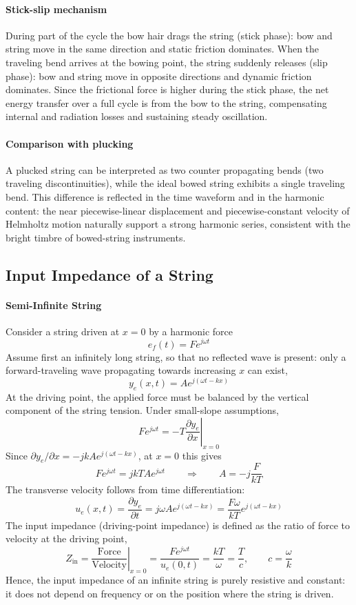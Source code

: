 \paragraph{Stick-slip mechanism} During part of the cycle the bow hair drags the string (stick phase): bow and string move in the same direction and static friction dominates. When the traveling bend arrives at the bowing point, the string suddenly releases (slip phase): bow and string move in opposite directions and dynamic friction dominates. Since the frictional force is higher during the stick phase, the net energy transfer over a full cycle is from the bow to the string, compensating internal and radiation losses and sustaining steady oscillation.

\paragraph{Comparison with plucking} A plucked string can be interpreted as two counter propagating bends (two traveling discontinuities), while the ideal bowed string exhibits a single traveling bend. This difference is reflected in the time waveform and in the harmonic content: the near piecewise-linear displacement and piecewise-constant velocity of Helmholtz motion naturally support a strong harmonic series, consistent with the bright timbre of bowed-string instruments.

\subsection{Input Impedance of a String}

\paragraph{Semi-Infinite String} Consider a string driven at \( x = 0 \) by a harmonic force
\[
e_f(t) = F e^{j\omega t}
\]
Assume first an infinitely long string, so that no reflected wave is present: only a forward-traveling wave propagating towards increasing \( x \) can exist,
\[
y_e(x,t) = A e^{j(\omega t-kx)}
\]
At the driving point, the applied force must be balanced by the vertical component of the string tension. Under small-slope assumptions,
\[
F e^{j\omega t} = -T\left.\frac{\partial y_e}{\partial x}\right|_{x = 0}
\]
Since \( \partial y_e/\partial x = -jkA e^{j(\omega t-kx)} \), at \( x = 0 \) this gives
\[
F e^{j\omega t} = jkT A e^{j\omega t}
\qquad\Longrightarrow\qquad
A = -j\frac{F}{kT}
\]
The transverse velocity follows from time differentiation:
\[
u_e(x,t) = \frac{\partial y_e}{\partial t}
 = j\omega A e^{j(\omega t-kx)}
 = \frac{F\omega}{kT}e^{j(\omega t-kx)}
\]
The input impedance (driving-point impedance) is defined as the ratio of force to velocity at the driving point,
\[
Z_{\mathrm{in}} = \left.\frac{\text{Force}}{\text{Velocity}}\right|_{x = 0}
 = \frac{F e^{j\omega t}}{u_e(0,t)}
 = \frac{kT}{\omega}
 = \frac{T}{c},
\qquad c = \frac{\omega}{k}
\]
Hence, the input impedance of an infinite string is purely resistive and constant: it does not depend on frequency or on the position where the string is driven.

